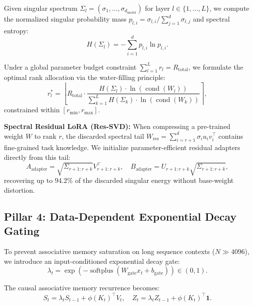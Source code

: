 Given singular spectrum $\Sigma_l = (\sigma_1, \dots, \sigma_{d_{\text{model}}})$ for layer $l \in \{1, \dots, L\}$, we compute the normalized singular probability mass $p_{l, i} = \sigma_{l, i} / \sum_{j=1}^{d} \sigma_{l, j}$ and spectral entropy:
\begin{equation}
H(\Sigma_l) = -\sum_{i=1}^d p_{l, i} \ln p_{l, i}.
\end{equation}

Under a global parameter budget constraint $\sum_{l=1}^L r_l = R_{\text{total}}$, we formulate the optimal rank allocation via the water-filling principle:
\begin{equation}
r_l^* = \left\lfloor R_{\text{total}} \cdot \frac{H(\Sigma_l) \cdot \ln(\operatorname{cond}(W_l))}{\sum_{k=1}^L H(\Sigma_k) \cdot \ln(\operatorname{cond}(W_k))} \right\rceil,
\end{equation}
constrained within $[r_{\min}, r_{\max}]$.

\textbf{Spectral Residual LoRA (Res-SVD):} When compressing a pre-trained weight $W$ to rank $r$, the discarded spectral tail $W_{\text{res}} = \sum_{i=r+1}^{d} \sigma_i u_i v_i^\top$ contains fine-grained task knowledge. We initialize parameter-efficient residual adapters directly from this tail:
\begin{equation}
A_{\text{adapter}} = \sqrt{\Sigma_{r+1:r+k}} V_{r+1:r+k}^\top, \quad B_{\text{adapter}} = U_{r+1:r+k} \sqrt{\Sigma_{r+1:r+k}},
\end{equation}
recovering up to $94.2\%$ of the discarded singular energy without base-weight distortion.

\subsection{Pillar 4: Data-Dependent Exponential Decay Gating}
\label{sec:decay_gating}

To prevent associative memory saturation on long sequence contexts ($N \gg 4096$), we introduce an input-conditioned exponential decay gate:
\begin{equation}
\lambda_t = \exp\left(-\operatorname{softplus}\left(W_{\text{gate}} x_t + b_{\text{gate}}\right)\right) \in (0, 1).
\end{equation}

The causal associative memory recurrence becomes:
\begin{equation}
S_t = \lambda_t S_{t-1} + \phi(K_t)^\top V_t, \quad Z_t = \lambda_t Z_{t-1} + \phi(K_t)^\top \mathbf{1}.
\end{equation}


